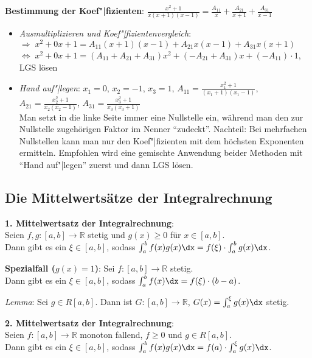 \textbf{Bestimmung der Koef"|fizienten}:
$\frac{x^2 + 1}{x(x+1)(x-1)} = \frac{A_{11}}{x} + \frac{A_{21}}{x + 1} +
\frac{A_{31}}{x - 1}$
\begin{itemize}
   \item \emph{Ausmultiplizieren und Koef"|fizientenvergleich}: \\
   $\Rightarrow\; x^2 + 0x + 1 = A_{11}(x + 1)(x - 1) + A_{21}x(x - 1) +
   A_{31}x(x + 1)$ \\
   $\Leftrightarrow\; x^2 + 0x + 1 = (A_{11} + A_{21} + A_{31})x^2 +
   (-A_{21} + A_{31})x + (-A_{11}) \cdot 1$, \qquad
   LGS lösen
   
   \item \emph{Hand auf"|legen}:
   $x_1 = 0$, $x_2 = -1$, $x_3 = 1$,
   $A_{11} = \frac{x_1^2 + 1}{(x_1 + 1)(x_1 - 1)}$,
   $A_{21} = \frac{x_2^2 + 1}{x_2 (x_2 - 1)}$,
   $A_{31} = \frac{x_3^2 + 1}{x_3 (x_3 + 1)}$ \\
   Man setzt in die linke Seite immer eine Nullstelle ein, während
   man den zur Nullstelle zugehörigen Faktor im Nenner "`zudeckt"'.
   Nachteil: Bei mehrfachen Nullstellen kann man nur den Koef"|fizienten mit
   dem höchsten Exponenten ermitteln.
   Empfohlen wird eine gemischte Anwendung beider Methoden mit
   "`Hand auf"|legen"' zuerst und dann LGS lösen.
\end{itemize}

\subsection{%
    Die Mittelwertsätze der Integralrechnung%
}

\textbf{1. Mittelwertsatz der Integralrechnung}: \\
Seien $f, g: [a,b] \rightarrow \mathbb{R}$ stetig und $g(x) \ge 0$
für $x \in [a,b]$. \\
Dann gibt es ein $\xi \in [a,b]$, sodass
$\int_a^b f(x)g(x)\dx = f(\xi) \cdot \int_a^b g(x)\dx$.

\textbf{Spezialfall ($g(x) = 1$)}:
Sei $f: [a,b] \rightarrow \mathbb{R}$ stetig. \\
Dann gibt es ein $\xi \in [a,b]$, sodass
$\int_a^b f(x)\dx = f(\xi) \cdot (b-a)$.

\linie

\emph{Lemma}: Sei $g \in R[a,b]$.
Dann ist $G: [a,b] \rightarrow \mathbb{R}$, $G(x) = \int_a^\xi g(x)\dx$ stetig.

\textbf{2. Mittelwertsatz der Integralrechnung}: \\
Seien $f: [a,b] \rightarrow \mathbb{R}$ monoton fallend, $f \ge 0$
und $g \in R[a,b]$. \\
Dann gibt es ein $\xi \in [a,b]$, sodass
$\int_a^b f(x)g(x)\dx = f(a) \cdot \int_a^\xi g(x)\dx$.

